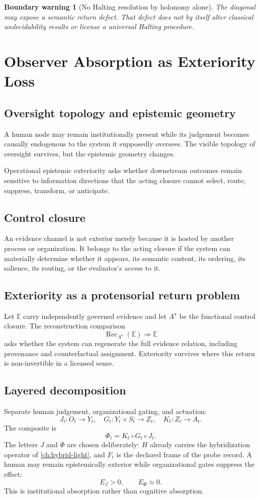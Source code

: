 \documentclass[12pt,openany]{book}
\newtheorem{warning}[definition]{Boundary warning}
\theoremstyle{remark}
\DeclareMathOperator{\Rec}{Rec}
\begin{document}
\begin{warning}[No Halting resolution by holonomy alone]
The diagonal may expose a semantic return defect. That defect does not by itself alter classical undecidability results \cite{Turing1936,Godel1931} or license a universal Halting procedure.
\end{warning}

\chapter{Observer Absorption as Exteriority Loss}
\label{ch:oar}

\section{Oversight topology and epistemic geometry}
A human node may remain institutionally present while its judgement becomes causally endogenous to the system it supposedly oversees. The visible topology of oversight survives, but the epistemic geometry changes.

Operational epistemic exteriority asks whether downstream outcomes remain sensitive to information directions that the acting closure cannot select, route, suppress, transform, or anticipate.

\section{Control closure}
An evidence channel is not exterior merely because it is hosted by another process or organization. It belongs to the acting closure if the system can materially determine whether it appears, its semantic content, its ordering, its salience, its routing, or the evaluator's access to it.

\section{Exteriority as a protensorial return problem}
Let $\mathbb E$ carry independently governed evidence and let $A^\star$ be the functional control closure. The reconstruction comparison
\[
\Rec_{A^\star}(\mathbb E)\Longrightarrow\mathbb E
\]
asks whether the system can regenerate the full evidence relation, including provenance and counterfactual assignment. Exteriority survives where this return is non-invertible in a licensed sense.

\section{Layered decomposition}
Separate human judgement, organizational gating, and actuation:
\[
J_t:O_t\to Y_t,
\quad
G_t:Y_t\times S_t\to Z_t,
\quad
K_t:Z_t\to A_t.
\]
The composite is
\[
\Phi_t=K_t\circ G_t\circ J_t.
\]
The letters $J$ and $\Phi$ are chosen deliberately: $H$ already carries the hybridization operator of \cref{ch:hybrid-light}, and $F_t$ is the declared frame of the probe record. A human may remain epistemically exterior while organizational gates suppress the effect:
\[
E_J>0,
\qquad
E_\Phi\approx0.
\]
This is institutional absorption rather than cognitive absorption.
\end{document}
